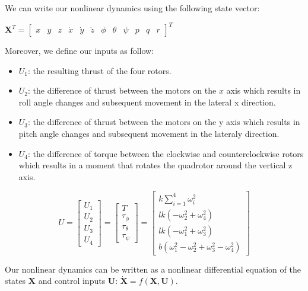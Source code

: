 We can write our nonlinear dynamics using the following state vector:

$\boldsymbol{X}^{T}=\left[\begin{array}{cccccccccccc}{x} & {y} & {z} & {\dot{x}} & {\dot{y}} & {\dot{z}} & {\phi} & {\theta} & {\psi} & {p} & {q} & {r}\end{array}\right]^{T}$

Moreover, we define our inputs as follow:
\begin{itemize}
  \item $U_1$: the resulting thrust of the four rotors.
  \item $U_2$: the difference of thrust between the motors on the $x$ axis which results in roll angle changes and subsequent movement in the lateral x direction.
  \item $U_3$: the difference of thrust between the motors on the y axis which results in pitch
  angle changes and subsequent movement in the lateraly direction.
  \item $U_4$: the difference of torque between the clockwise and counterclockwise rotors which
  results in a moment that rotates the quadrotor around the vertical z axis.
\end{itemize}

$$U=\left[ \begin{array}{l}{U_{1}} \\ {U_{2}} \\ {U_{3}} \\ {U_{4}}\end{array}\right]= \left[ \begin{array}{c}{T} \\ {\tau_{\phi}} \\ {\tau_{\theta}} \\ {\tau_{\psi}}\end{array}\right]=
\left[ \begin{array}{c}
{k \sum_{i=1}^{4} \omega_{i}^{2}} \\
{l k\left(-\omega_{2}^{2}+\omega_{4}^{2}\right)} \\ 
{l k\left(-\omega_{1}^{2}+\omega_{3}^{2}\right)} \\ 
{b(\omega_{1}^{2}-\omega_{2}^{2}+\omega_{3}^{2}-\omega_{4}^{2})}\end{array}\right]
$$

Our nonlinear dynamics can be written as a nonlinear differential equation of the states $\boldsymbol{X}$ and control inputs $\boldsymbol{U}$:
$\dot{\boldsymbol{X}}=f(\boldsymbol{X}, \boldsymbol{U}).$

